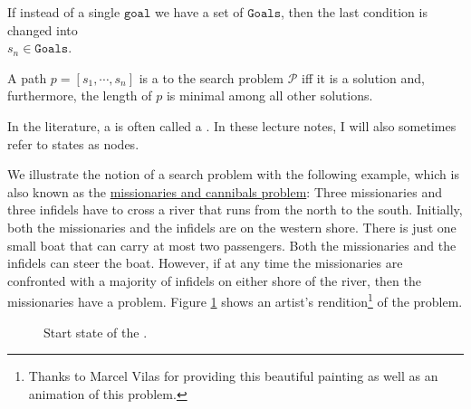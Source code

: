 \begin{Definition}
\begin{enumerate}
        If instead of a single $\texttt{goal}$ we have a set of $\texttt{Goals}$, then the last condition
        is changed into
        \\[0.2cm]
        \hspace*{1.3cm}
        $s_n \in \mathtt{Goals}$.
  \end{enumerate}
  A path $p = [s_1, \cdots, s_n]$ is a  to the search problem $\mathcal{P}$
  iff it is a solution and, furthermore, the length of $p$ is minimal among all other solutions. \eoxs
\end{Definition}

\remark
In the literature, a  is often called a .  
In these lecture notes, I will also sometimes refer to states as nodes.  \eoxs

\example
We illustrate the notion of a search problem with the following example, which is also known as the
\href{https://en.wikipedia.org/wiki/Missionaries_and_cannibals_problem}{missionaries and cannibals problem}:
Three missionaries and three infidels have to cross a river that runs from the north to the south.
Initially, both the missionaries and the infidels are on the western shore.  There is just one small boat 
that can carry at most two passengers.  Both the missionaries and the infidels can steer the boat.
However, if at any time the missionaries are confronted with a majority of infidels on either shore of the
river, then the missionaries have a problem.  Figure \ref{fig:missionaries-and-infidels.pdf} shows an 
artist's rendition\footnote{Thanks to Marcel Vilas for providing this beautiful painting as well as an
  animation of this problem.}
of the problem.

\begin{figure}[!ht]
  \centering
  \caption{Start state of the .}
  \label{fig:missionaries-and-infidels.pdf}
\end{figure}


